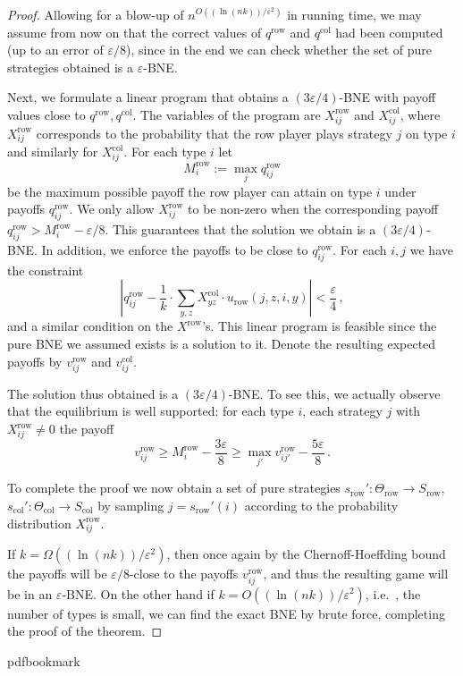 \documentclass[10pt]{article}
\theoremstyle{definition}
\providecommand{\ie}{i.e.\ }
\numberwithin{equation}{section}
\newcommand{\eps}{\varepsilon}
\newcommand{\Ta}{\Theta}
\newcommand{\ra}{\rightarrow}
\begin{document}
\begin{proof}
Allowing for a blow-up of $n^{O((\ln (nk))/\eps^2)}$ in running time, we may assume from now on that the correct values 
of $q^{\mathrm{row}}$ and $q^\mathrm{col}$ had been computed (up to an error of $\eps/8$), since in the end we can check whether the set of pure strategies obtained 
is a $\eps$-BNE.

Next, we formulate a linear program that obtains a $(3\eps/4)$-BNE with payoff values close to $q^{\mathrm{row}},q^\mathrm{col}$. The variables 
of the program are $X^{\mathrm{row}}_{ij}$ and $X^\mathrm{col}_{ij}$, where $X^{\mathrm{row}}_{ij}$ corresponds to the probability that the row player plays strategy 
$j$ on type $i$ and similarly for $X^{\mathrm{col}}_{ij}$. For each type $i$ let $$M^{\mathrm{row}}_i := \max_j q^{\mathrm{row}}_{ij}$$ be the maximum possible payoff the row player can attain 
on type $i$ under payoffs $q^{\mathrm{row}}_{ij}$. We only allow $X^{\mathrm{row}}_{ij}$ to be non-zero when the corresponding payoff 
$q^{\mathrm{row}}_{ij}> M^{\mathrm{row}}_i - \eps/8$. This guarantees that the solution we obtain is a $(3\eps/4)$-BNE\@. In addition, we enforce
the payoffs to be close to $q^{\mathrm{row}}_{ij}$. For each $i,j$ we have the constraint
$$
\left| q^{\mathrm{row}}_{ij} - \frac{1}{k}\cdot \sum_{y,z} X^\mathrm{col}_{yz} \cdot u_{\mathrm{row}}(j,z,i,y) \right| < \frac{\eps}{4}\,,
$$ 
and a similar condition on the $X^{\mathrm{row}}$'s. 
This linear program is feasible since the pure BNE we assumed exists is a solution to it. Denote the 
resulting expected payoffs by $v^{\mathrm{row}}_{ij}$ and $v^\mathrm{col}_{ij}$. 

The solution thus obtained is a $(3\eps/4)$-BNE\@. To see this, we actually observe that  the equilibrium is well supported: for each type $i$, 
each strategy $j$ with $X^{\mathrm{row}}_{ij}\neq 0$ the payoff 
\[
v^{\mathrm{row}}_{ij}\ge M_i^{\mathrm{row}}-\frac{3\eps}{8} \ge \max_{j'}
v^{\mathrm{row}}_{ij'}- \frac{5\eps}{8}\,.
\] 

To complete the proof we now obtain a set of pure strategies $s_{\mathrm{row}}':\Ta_{\mathrm{row}}\ra S_{\mathrm{row}}$, $s_\mathrm{col}':\Ta_\mathrm{col}\ra S_\mathrm{col}$ by sampling 
$j=s_{\mathrm{row}}'(i)$ according to the probability distribution $X^{\mathrm{row}}_{ij}$. 

If $k=\Omega((\ln (nk))/\eps^2)$, then once again by the Chernoff-Hoeffding
bound the payoffs will be $\eps/8$-close to the payoffs
$v^{\mathrm{row}}_{ij}$, and thus the resulting game will be in an
$\eps$-BNE\@.  On the other hand if $k=O((\ln (nk))/\eps^2)$, \ie, the
number of types is small, we can find the exact BNE by brute force,
completing the proof of the theorem.
\end{proof}
\clearpage
\begingroup\raggedright
%
%
%
%
%
\providecommand{\bibhead}[1]{}
%
\expandafter\ifx\csname pdfbookmark\endcsname\relax%
  \providecommand{\tocrefpdfbookmark}{}
\else\providecommand{\tocrefpdfbookmark}{%
   \hypertarget{tocreferences}{}%
   \pdfbookmark[1]{References}{tocreferences}}%
\fi
\end{document}
